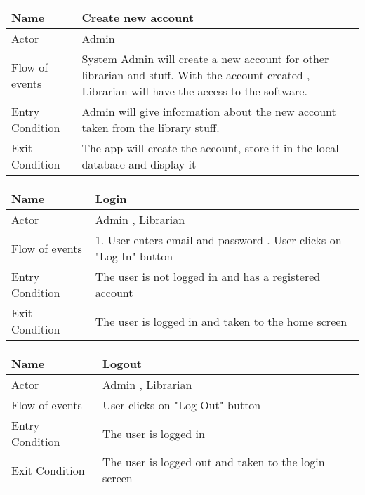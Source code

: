 \begin{center}

\begin{tabular}{ | m{7em} | m{9cm}|} 
  \hline
  Name & Create new account\\ 
  \hline    
  Actor & Admin \\ 
  \hline
  Flow of events & 
    System Admin will create a new account for other librarian and stuff. With the account created , Librarian will have the access to the software. \\
  \hline
  
  Entry Condition & Admin will give information about the new account taken from the library stuff. \\
  \hline
  Exit Condition & The app will create the account, store it in the local database and display it \\
  \hline

\end{tabular}

\vspace{1cm}

\begin{tabular}{ | m{7em} | m{9cm}|} 
  \hline
  Name & Login\\ 
  \hline    
  Actor & Admin , Librarian \\ 
  \hline
  Flow of events & 
    1. User enters email and password
    \newline
    2. User clicks on "Log In" button\\
  \hline
  
   Entry Condition & The user is not logged in and has a registered account  \\
  \hline
  Exit Condition & The user is logged in and taken to the home screen \\
  \hline

\end{tabular}

\vspace{1cm}

\begin{tabular}{ | m{7em} | m{9cm}|} 
  \hline
  Name & Logout\\ 
  \hline    
  Actor &  Admin , Librarian \\ 
  \hline
  Flow of events & 
 User clicks on "Log Out" button \\
  \hline
  
   Entry Condition & The user is logged in \\
  \hline
  Exit Condition & The user is logged out and taken to the login screen \\
  \hline


\end{tabular}
\end{center}

